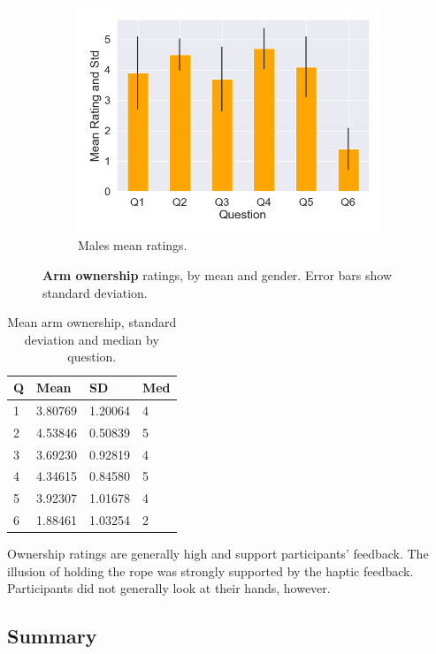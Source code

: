 \begin{figure}[H]
  \hspace{10mm}
 \begin{subfigure}[b]{\textwidth}
 \centering
 \includegraphics[scale=0.5]{Files/Plots/ownership_mean_ratings_m.png}
 \caption{Males mean ratings.}
 \label{fig:ownMale}
 \end{subfigure}
 \caption{\textbf{Arm ownership} ratings, by mean and gender. Error bars show standard deviation.}
\label{fig:ownAll}
\end{figure}


\begin{table}
\begin{tabular}{|llll|}
\hline
Q & Mean & SD & Med \\
\hline
1 & 3.80769 & 1.20064& 4 \\  
2 & 4.53846 & 0.50839& 5\\  
3 & 3.69230 &  0.92819& 4\\  
4 & 4.34615 & 0.84580& 5\\  
5 & 3.92307 &  1.01678&4 \\  
6 & 1.88461 &  1.03254& 2\\  
\hline
\end{tabular}
\caption{Mean arm ownership, standard deviation and median by question.}
\label{tbl:own}
\end{table} 
Ownership ratings are generally high and support participants' feedback. The illusion of holding the rope was strongly supported by the haptic feedback. Participants did not generally look at their hands, however. 
\clearpage

\subsection{Summary}